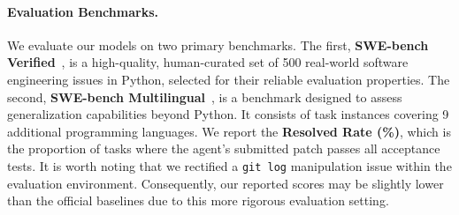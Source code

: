 \documentclass{article}
\theoremstyle{plain}
\theoremstyle{definition}
\theoremstyle{remark}
\begin{document}
\paragraph{Evaluation Benchmarks.} 
We evaluate our models on two primary benchmarks. 
The first, \textbf{SWE-bench Verified}~\cite{chowdhury2024swebenchverified}, is a high-quality, human-curated set of 500 real-world software engineering issues in Python, selected for their reliable evaluation properties. 
The second, \textbf{SWE-bench Multilingual}~\cite{swebench_multilingual}, is a benchmark designed to assess generalization capabilities beyond Python. It consists of task instances covering 9 additional programming languages. 
We report the \textbf{Resolved Rate (\%)}, which is the proportion of tasks where the agent's submitted patch passes all acceptance tests.
It is worth noting that we rectified a \texttt{git log} manipulation issue within the evaluation environment. Consequently, our reported scores may be slightly lower than the official baselines due to this more rigorous evaluation setting.
\end{document}
